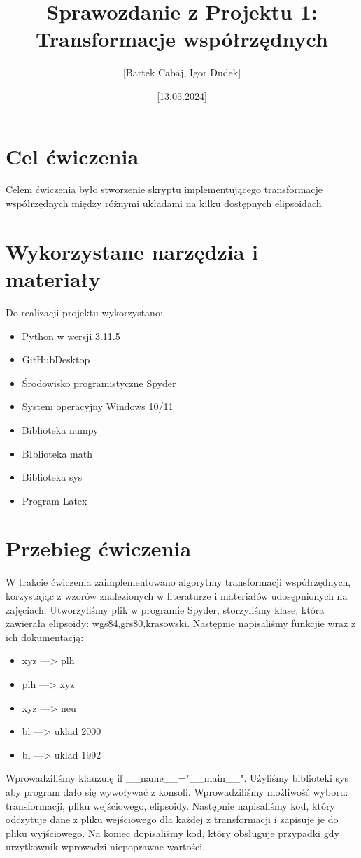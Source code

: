 \documentclass[11pt, a4paper]{article}
\title{Sprawozdanie z Projektu 1: Transformacje współrzędnych}
\author{[Bartek Cabaj, Igor Dudek]}
\date{[13.05.2024]}
\begin{document}
	
	\maketitle
	
	\section{Cel ćwiczenia}
	Celem ćwiczenia było stworzenie skryptu implementującego transformacje współrzędnych między różnymi układami na kilku dostępnych elipsoidach.
	
	\section{Wykorzystane narzędzia i materiały}
	Do realizacji projektu wykorzystano:

	
	\begin{itemize}
		\item Python w wersji 3.11.5
		\item GitHubDesktop
		\item Środowisko programistyczne Spyder
		\item System operacyjny Windows 10/11
		\item Biblioteka numpy
		\item BIblioteka math
		\item Biblioteka sys
		\item Program Latex 
	\end{itemize}
	
	\section{Przebieg ćwiczenia}
	W trakcie ćwiczenia zaimplementowano algorytmy transformacji współrzędnych, korzystając z wzorów znalezionych w literaturze i materiałów udosępnionych na zajęciach. Utworzyliśmy plik w programie Spyder, storzyliśmy klase, która zawierała elipsoidy: wgs84,grs80,krasowski. Następnie napisaliśmy funkcjie wraz z ich dokumentacją:
	\begin{itemize}
		\item xyz ---> plh
		\item plh ---> xyz
		\item xyz ---> neu
		\item bl ---> uklad 2000
		\item bl ---> uklad 1992
		
	\end{itemize} 
	 Wprowadziliśmy klauzulę if \_\_name\_\_="\_\_main\_\_".
	 Użyliśmy biblioteki sys aby program dało się wywoływać z konsoli. Wprowadziliśmy możliwość wyboru: transformacji, pliku wejściowego, elipsoidy.
	 Następnie napisaliśmy kod, który odczytuje dane z pliku wejściowego dla każdej z transformacji i zapisuje je do pliku wyjściowego. Na koniec dopisaliśmy kod, który obsługuje przypadki gdy urzytkownik wprowadzi niepoprawne wartości.
	 
\end{document}
